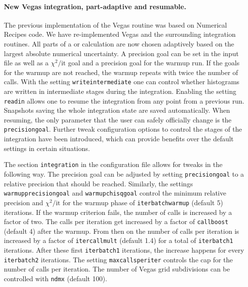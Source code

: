 \paragraph{New Vegas integration, part-adaptive and resumable.}

The previous implementation of the Vegas routine was based on Numerical Recipes code. We have re-implemented
Vegas and the surrounding integration routines. All parts of a \NLO{} or \NNLO{} calculation are now
chosen adaptively based on the largest absolute numerical uncertainty. A precision goal can be set
in the input file as well as a $\chi^2/\text{it}$ goal and a precision goal for the warmup run. If
the goals for the warmup are not reached, the warmup repeats with twice the number of calls. With the
setting \texttt{writeintermediate} one can control whether histograms are written in intermediate
stages during the integration. Enabling the setting \texttt{readin} allows one to resume the integration
from any point from a previous run. Snapshots saving the whole integration state are saved automatically.
When resuming, the only parameter that the user can safely officially change is the \texttt{precisiongoal}. Further
tweak configuration options to control the stages of the integration have been introduced, which can provide
benefits over the default settings in certain situations.

The section \texttt{integration} in the configuration file allows for tweaks in the following way. The precision
goal can be adjusted by setting \texttt{precisiongoal} to a relative precision that should be reached. Similarly,
the settings \texttt{warmupprecisiongoal} and \texttt{warmupchisqgoal} control the minimum relative precision and
$\chi^2/\text{it}$ for the warmup phase of \texttt{iterbatchwarmup} (default 5) iterations. If the warmup criterion
fails, the number of calls is increased by a factor of two. The calls per iteration get increased by a factor of 
\texttt{callboost} (default 4) after the warmup. From then on the number of calls per iteration is 
increased by a factor of \texttt{itercallmult} (default 1.4) for a total of \texttt{iterbatch1} iterations. After these 
first \texttt{iterbatch1} iterations, the increase happens for every \texttt{iterbatch2} iterations. The setting 
\texttt{maxcallsperiter} controls the cap for the number of calls per iteration. The 
number of Vegas grid subdivisions can be controlled with \texttt{ndmx} (default 100).

